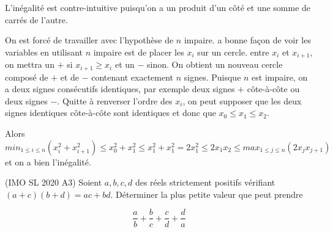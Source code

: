 \begin{sol}
L'inégalité est contre-intuitive puisqu'on a un produit d'un côté et une somme de carrés de l'autre.

On est forcé de travailler avec l'hypothèse de $n$ impaire. a bonne façon de voir les variables en utilisant $n$ impaire est de placer les $x_i$ sur un cercle. entre $x_i$ et $x_{i+1}$, on mettra un $+$ si $x_{i+1}\geq x_i$ et un $-$ sinon. On obtient un nouveau cercle composé de $+$ et de $-$ contenant exactement $n$ signes. Puisque $n$ est impaire, on a deux signes consécutifs identiques, par exemple deux signes $+$ côte-à-côte ou deux signes $-$. Quitte à renverser l'ordre des $x_i$, on peut supposer que les deux signes identiques côte-à-côte sont identiques et donc que $x_0\leq x_1\leq x_2$.

Alors $$min _{1\leq i\leq n} (x_i^2+x_{i+1}^2)\leq x_0^2+x_1^2\leq x_1^2+x_1^2=2x_1^2\leq 2x_1x_2\leq max_{1\leq j\leq n}(2x_jx_{j+1})$$ et on a bien l'inégalité.
\end{sol}


\begin{exo}
(IMO SL 2020 A3)
Soient $a,b,c,d$ des réels strictement positifs vérifiant $(a+c)(b+d)=ac+bd$. Déterminer la plus petite valeur que peut prendre

\[\frac{a}{b}+\frac{b}{c}+\frac{c}{d}+\frac{d}{a}\]
\end{exo}

